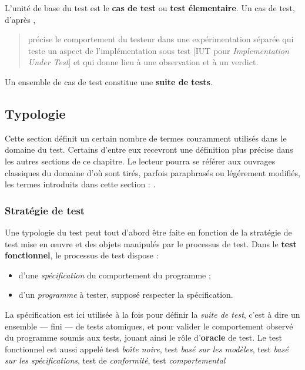L'unit\'e de base du test est le \textbf{cas de test} ou \textbf{test \'elementaire}. Un cas de test,
d'apr\`es \cite{itu-z500}, 
\begin{quote}
    \og [...] pr\'ecise le comportement du testeur dans une
    exp\'erimentation s\'epar\'ee qui teste un aspect de
    l'impl\'ementation sous test [\textsf{IUT} pour \emph{Implementation
    Under Test}] et qui donne lieu \`a une observation et \`a un
    verdict. \fg
\end{quote}
Un ensemble de cas de test constitue une \textbf{suite de tests}.

\subsection{Typologie}

Cette section d\'efinit un certain nombre de termes couramment
utilis\'es dans le domaine du test. Certains d'entre eux recevront une d\'efinition plus
pr\'ecise dans les autres sections de ce chapitre. Le lecteur pourra
se r\'ef\'erer aux ouvrages classiques du domaine d'o\`u sont
tir\'es, parfois paraphras\'es ou l\'eg\'erement
modifi\'es, les termes introduits dans cette section :
\cite{binder,art-soft-test,bb-testing,testlog,itu-z500}. 
 
\subsubsection{Strat\'egie de test}

Une typologie du test peut tout d'abord \^etre faite en fonction de
la strat\'egie de test mise en \oe uvre et des objets manipul\'es
par le processus de test. 
Dans le \textbf{test fonctionnel}, le processus de test
dispose :
\begin{itemize}
  \item d'une \emph{sp\'ecification} du comportement du programme ;
  \item d'un \emph{programme} \`a tester, suppos\'e respecter la
  sp\'ecification.
\end{itemize}
La sp\'ecification est ici utilis\'ee \`a la fois pour d\'efinir
la \emph{suite de test}, c'est \`a dire un ensemble --- fini --- de tests
atomiques, et pour valider le comportement observ\'e du programme
soumis aux tests, jouant ainsi le r\^ole d'\textbf{oracle} de
test. Le test fonctionnel est  aussi appel\'e test \emph{bo\^{\i}te noire},
test \emph{bas\'e sur les mod\`eles}, test \emph{bas\'e sur les
sp\'ecifications}, test de \emph{conformit\'e}, test \emph{comportemental}

